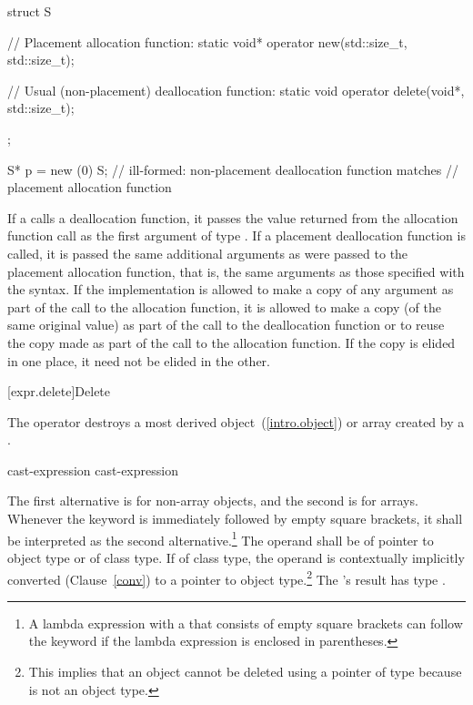 \begin{codeblock}
struct S { 
  // Placement allocation function:
  static void* operator new(std::size_t, std::size_t); 

  // Usual (non-placement) deallocation function:
  static void operator delete(void*, std::size_t); 
}; 

S* p = new (0) S;   // ill-formed: non-placement deallocation function matches 
                    // placement allocation function 
\end{codeblock}

\exitexample

\pnum
If a  calls a deallocation function, it passes
the value returned from the allocation function call as the first
argument of type . If a placement deallocation function is
called, it is passed the same additional arguments as were passed to the
placement allocation function, that is, the same arguments as those
specified with the  syntax. If the
implementation is allowed to make a copy of any argument as part of the
call to the allocation function, it is allowed to make a copy (of the
same original value) as part of the call to the deallocation function or
to reuse the copy made as part of the call to the allocation function.
If the copy is elided in one place, it need not be elided in the other.

[expr.delete]{Delete}

\pnum
{}%
%
The  operator destroys a most derived
object~(\ref{intro.object}) or array created by a
.

\begin{bnf}
\br
    \terminal{::}\opt {} cast-expression\br
    \terminal{::}\opt {} cast-expression
\end{bnf}

The first alternative is for non-array objects, and the second is for arrays. Whenever
the  keyword is immediately followed by empty square brackets, it shall be
interpreted as the second alternative.\footnote{A lambda expression with a
 that consists of
empty square brackets can follow the  keyword if the lambda expression is
enclosed in parentheses.}
The operand shall be of pointer to object type or of class type. If of
class type, the operand is contextually implicitly converted
(Clause~\ref{conv}) to a pointer to object
type.\footnote{This implies that an object
cannot be deleted using a pointer of type
 because  is not an object type.}
The 's result has type
.

